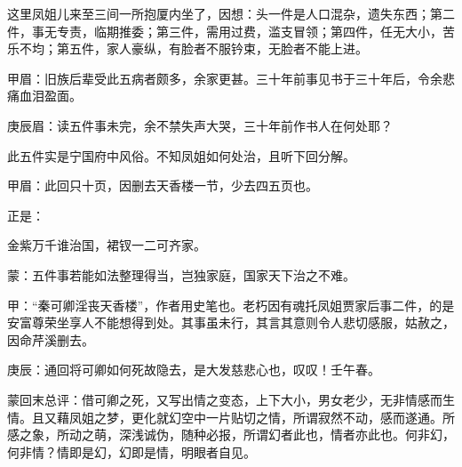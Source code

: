 \begin{parag}
    这里凤姐儿来至三间一所抱厦内坐了，因想：头一件是人口混杂，遗失东西；第二件，事无专责，临期推委；第三件，需用过费，滥支冒领；第四件，任无大小，苦乐不均；第五件，家人豪纵，有脸者不服钤束，无脸者不能上进。\begin{note}甲眉：旧族后辈受此五病者颇多，余家更甚。三十年前事见书于三十年后，令余悲痛血泪盈面。\end{note}\begin{note}庚辰眉：读五件事未完，余不禁失声大哭，三十年前作书人在何处耶？\end{note}此五件实是宁国府中风俗。不知凤姐如何处治，且听下回分解。\begin{note}甲眉：此回只十页，因删去天香楼一节，少去四五页也。\end{note}
\end{parag}


\begin{parag}
    正是：
\end{parag}


\begin{poem}
    \begin{pl} 金紫万千谁治国，裙钗一二可齐家。\end{pl}
    \begin{note}蒙：五件事若能如法整理得当，岂独家庭，国家天下治之不难。\end{note}
\end{poem}


\begin{parag}
    \begin{note}甲：“秦可卿淫丧天香楼”，作者用史笔也。老朽因有魂托凤姐贾家后事二件，的是安富尊荣坐享人不能想得到处。其事虽未行，其言其意则令人悲切感服，姑赦之，因命芹溪删去。\end{note}
\end{parag}


\begin{parag}
    \begin{note}庚辰：通回将可卿如何死故隐去，是大发慈悲心也，叹叹！壬午春。\end{note}
\end{parag}


\begin{parag}
    \begin{note}蒙回末总评：借可卿之死，又写出情之变态，上下大小，男女老少，无非情感而生情。且又藉凤姐之梦，更化就幻空中一片贴切之情，所谓寂然不动，感而遂通。所感之象，所动之萌，深浅诚伪，随种必报，所谓幻者此也，情者亦此也。何非幻，何非情？情即是幻，幻即是情，明眼者自见。\end{note}
\end{parag}

